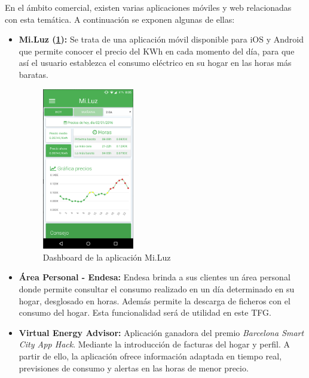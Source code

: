 En el ámbito comercial, existen varias aplicaciones móviles y web relacionadas con esta temática. A continuación se exponen algunas de ellas:
\begin{itemize}
\item \textbf{Mi.Luz (\ref{fig:miluz}):} Se trata de una aplicación móvil disponible para iOS y Android que permite conocer el precio del KWh en cada momento del día, para que así el usuario establezca el consumo eléctrico en su hogar en las horas más baratas.
  \begin{figure}[!h]
	\centering
	\includegraphics[width=4cm]{figs/miluz.png}
	\caption{Dashboard de la aplicación Mi.Luz}
        \label{fig:miluz}
\end{figure}
\item \textbf{Área Personal - Endesa:} Endesa brinda a sus clientes un área personal donde permite consultar el consumo realizado en un día determinado en su hogar, desglosado en horas. Además permite la descarga de ficheros con el consumo del hogar. Esta funcionalidad será de utilidad en este \gls{TFG}.
\item \textbf{Virtual Energy Advisor:} Aplicación ganadora del premio \textit{Barcelona Smart City App Hack}. Mediante la introducción de facturas del hogar y perfil. A partir de ello, la aplicación ofrece información adaptada en tiempo real, previsiones de consumo y alertas en las horas de menor precio.
\end{itemize}
